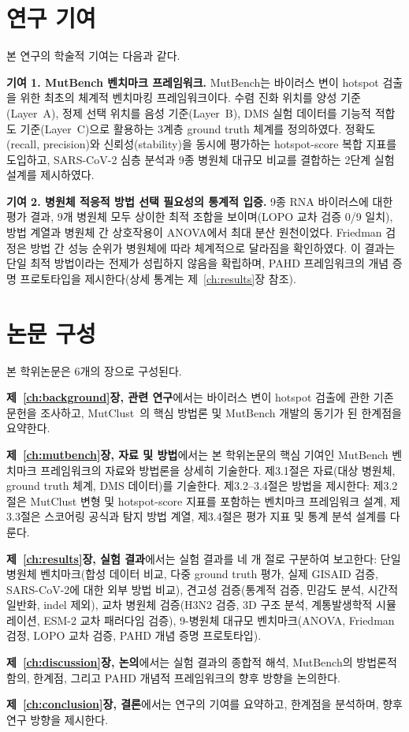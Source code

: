 \section{연구 기여}
\label{sec:intro_contributions}

본 연구의 학술적 기여는 다음과 같다.

\textbf{기여 1. MutBench 벤치마크 프레임워크.}
MutBench는 바이러스 변이 hotspot 검출을 위한 최초의 체계적 벤치마킹 프레임워크이다.
수렴 진화 위치를 양성 기준(Layer~A), 정제 선택 위치를 음성 기준(Layer~B), DMS 실험 데이터를 기능적 적합도 기준(Layer~C)으로 활용하는 3계층 ground truth 체계를 정의하였다.
정확도(recall, precision)와 신뢰성(stability)을 동시에 평가하는 hotspot-score 복합 지표를 도입하고, SARS-CoV-2 심층 분석과 9종 병원체 대규모 비교를 결합하는 2단계 실험 설계를 제시하였다.

\textbf{기여 2. 병원체 적응적 방법 선택 필요성의 통계적 입증.}
9종 RNA 바이러스에 대한 평가 결과, 9개 병원체 모두 상이한 최적 조합을 보이며(LOPO 교차 검증 0/9 일치), 방법 계열과 병원체 간 상호작용이 ANOVA에서 최대 분산 원천이었다.
Friedman 검정은 방법 간 성능 순위가 병원체에 따라 체계적으로 달라짐을 확인하였다.
이 결과는 단일 최적 방법이라는 전제가 성립하지 않음을 확립하며, PAHD 프레임워크의 개념 증명 프로토타입을 제시한다(상세 통계는 제~\ref{ch:results}장 참조).


\section{논문 구성}
\label{sec:intro_organization}

본 학위논문은 6개의 장으로 구성된다.

\textbf{제~\ref{ch:background}장, 관련 연구}에서는 바이러스 변이 hotspot 검출에 관한 기존 문헌을 조사하고, MutClust~\cite{youn2025mutclust}의 핵심 방법론 및 MutBench 개발의 동기가 된 한계점을 요약한다.

\textbf{제~\ref{ch:mutbench}장, 자료 및 방법}에서는 본 학위논문의 핵심 기여인 MutBench 벤치마크 프레임워크의 자료와 방법론을 상세히 기술한다.
제3.1절은 자료(대상 병원체, ground truth 체계, DMS 데이터)를 기술한다. 제3.2--3.4절은 방법을 제시한다: 제3.2절은 MutClust 변형 및 hotspot-score 지표를 포함하는 벤치마크 프레임워크 설계, 제3.3절은 스코어링 공식과 탐지 방법 계열, 제3.4절은 평가 지표 및 통계 분석 설계를 다룬다.

\textbf{제~\ref{ch:results}장, 실험 결과}에서는 실험 결과를 네 개 절로 구분하여 보고한다: 단일 병원체 벤치마크(합성 데이터 비교, 다중 ground truth 평가, 실제 GISAID 검증, SARS-CoV-2에 대한 외부 방법 비교), 견고성 검증(통계적 검증, 민감도 분석, 시간적 일반화, indel 제외), 교차 병원체 검증(H3N2 검증, 3D 구조 분석, 계통발생학적 시뮬레이션, ESM-2 교차 패러다임 검증), 9-병원체 대규모 벤치마크(ANOVA, Friedman 검정, LOPO 교차 검증, PAHD 개념 증명 프로토타입).

\textbf{제~\ref{ch:discussion}장, 논의}에서는 실험 결과의 종합적 해석, MutBench의 방법론적 함의, 한계점, 그리고 PAHD 개념적 프레임워크의 향후 방향을 논의한다.

\textbf{제~\ref{ch:conclusion}장, 결론}에서는 연구의 기여를 요약하고, 한계점을 분석하며, 향후 연구 방향을 제시한다.

